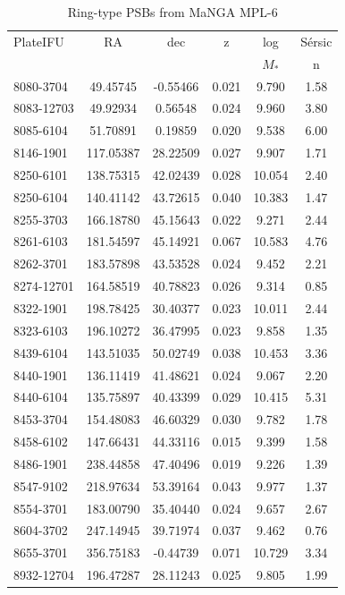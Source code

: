 \begin{table}
\caption{Ring-type PSBs from MaNGA MPL-6}
\label{tab:my-RPSBs}
\begin{tabular}{lccccc}
\hline
PlateIFU & RA & dec & z & log & S\'ersic \\
& & & & $M_*$ & n \\
\hline
8080-3704 & 49.45745 & -0.55466 & 0.021 & 9.790 & 1.58 \\
8083-12703 & 49.92934 & 0.56548 & 0.024 & 9.960 & 3.80 \\
8085-6104 & 51.70891 & 0.19859 & 0.020 & 9.538 & 6.00 \\
8146-1901 & 117.05387 & 28.22509 & 0.027 & 9.907 & 1.71 \\
8250-6101 & 138.75315 & 42.02439 & 0.028 & 10.054 & 2.40 \\
8250-6104 & 140.41142 & 43.72615 & 0.040 & 10.383 & 1.47 \\
8255-3703 & 166.18780 & 45.15643 & 0.022 & 9.271 & 2.44 \\
8261-6103 & 181.54597 & 45.14921 & 0.067 & 10.583 & 4.76 \\
8262-3701 & 183.57898 & 43.53528 & 0.024 & 9.452 & 2.21 \\
8274-12701 & 164.58519 & 40.78823 & 0.026 & 9.314 & 0.85 \\
8322-1901 & 198.78425 & 30.40377 & 0.023 & 10.011 & 2.44 \\
8323-6103 & 196.10272 & 36.47995 & 0.023 & 9.858 & 1.35 \\
8439-6104 & 143.51035 & 50.02749 & 0.038 & 10.453 & 3.36 \\
8440-1901 & 136.11419 & 41.48621 & 0.024 & 9.067 & 2.20 \\
8440-6104 & 135.75897 & 40.43399 & 0.029 & 10.415 & 5.31 \\
8453-3704 & 154.48083 & 46.60329 & 0.030 & 9.782 & 1.78 \\
8458-6102 & 147.66431 & 44.33116 & 0.015 & 9.399 & 1.58 \\
8486-1901 & 238.44858 & 47.40496 & 0.019 & 9.226 & 1.39 \\
8547-9102 & 218.97634 & 53.39164 & 0.043 & 9.977 & 1.37 \\
8554-3701 & 183.00790 & 35.40440 & 0.024 & 9.657 & 2.67 \\
8604-3702 & 247.14945 & 39.71974 & 0.037 & 9.462 & 0.76 \\
8655-3701 & 356.75183 & -0.44739 & 0.071 & 10.729 & 3.34 \\
8932-12704 & 196.47287 & 28.11243 & 0.025 & 9.805 & 1.99 \\

\end{tabular}
\end{table}

